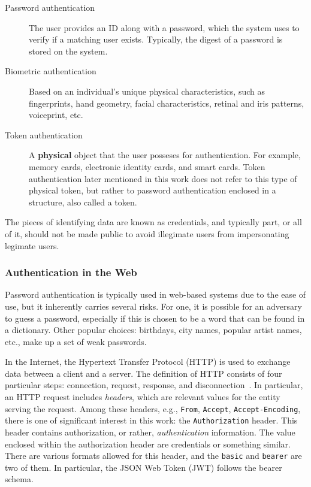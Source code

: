 \documentclass[12pt]{article}
\begin{document}
\begin{description}
\item[Password authentication] The user provides an ID along with a password, which the system uses to verify if a matching user exists. Typically, the digest of a password is stored on the system. 
\item[Biometric authentication] Based on an individual's unique physical characteristics, such as fingerprints, hand geometry, facial characteristics, retinal and iris patterns, voiceprint, etc. 
\item[Token authentication] A \textbf{physical} object that the user posseses for authentication. For example, memory cards, electronic identity cards, and smart cards. Token authentication later mentioned in this work does not refer to this type of physical token, but rather to password authentication enclosed in a structure, also called a token.
\end{description}

The pieces of identifying data are known as credentials, and typically part, or all of it, should not be made public to avoid illegimate users from impersonating legimate users. 

\subsubsection{Authentication in the Web}

Password authentication is typically used in web-based systems due to the ease of use, but it inherently carries several risks. For one, it is possible for an adversary to guess a password, especially if this is chosen to be a word that can be found in a dictionary. Other popular choices: birthdays, city names, popular artist names, etc., make up a set of weak passwords.

In the Internet, the Hypertext Transfer Protocol (HTTP) is used to exchange data between a client and a server. The definition of HTTP consists of four particular steps: connection, request, response, and disconnection~\cite{RFC2616}. In particular, an HTTP request includes \emph{headers}, which are relevant values for the entity serving the request. Among these headers, e.g., \texttt{From}, \texttt{Accept}, \texttt{Accept-Encoding}, there is one of significant interest in this work: the \texttt{Authorization} header. This header contains authorization, or rather, \emph{authentication} information. The value enclosed within the authorization header are credentials or something similar. There are various formats allowed for this header, and the \texttt{basic} and \texttt{bearer} are two of them. In particular, the JSON Web Token (JWT) follows the bearer schema.
\end{document}
